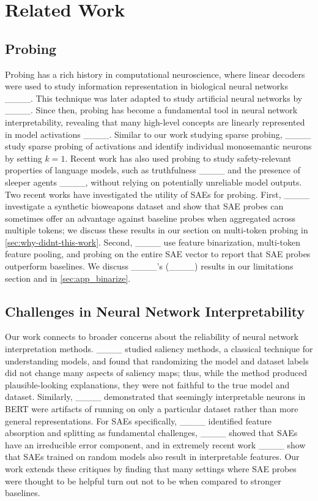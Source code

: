 \section{Related Work}
\label{sec:app-related-work}

\subsection{Probing}
Probing has a rich history in computational neuroscience, where linear decoders were used to study information representation in biological neural networks ____. This technique was later adapted to study artificial neural networks by ____. Since then, probing has become a fundamental tool in neural network interpretability, revealing that many high-level concepts are linearly represented in model activations ____. Similar to our work studying sparse probing, ____ study sparse probing of activations and identify individual monosemantic neurons by setting $k = 1$. Recent work has also used probing to study safety-relevant properties of language models, such as truthfulness ____ and the presence of sleeper agents ____, without relying on potentially unreliable model outputs. Two recent works have investigated the utility of SAEs for probing. First, ____ investigate a synthetic bioweapons dataset and show that SAE probes can sometimes offer an advantage against baseline probes when aggregated across multiple tokens; we discuss these results in our section on multi-token probing in \cref{sec:why-didnt-this-work}. Second, ____ use feature binarization, multi-token feature pooling, and probing on the entire SAE vector to report that SAE probes outperform baselines. We discuss ____'s (____) results in our limitations section and in \cref{sec:app_binarize}.

\subsection{Challenges in Neural Network Interpretability}
Our work connects to broader concerns about the reliability of neural network interpretation methods. ____ studied saliency methods, a classical technique for understanding models, and found that randomizing the model and dataset labels did not change many aspects of saliency maps; thus, while the method produced plausible-looking explanations, they were not faithful to the true model and dataset. Similarly, ____ demonstrated that seemingly interpretable neurons in BERT were artifacts of running on only a particular dataset rather than more general representations. For SAEs specifically, ____ identified feature absorption and splitting as fundamental challenges, ____ showed that SAEs have an irreducible error component, and in extremely recent work ____ show that SAEs trained on random models also result in interpretable features. Our work extends these critiques by finding that many settings where SAE probes were thought to be helpful turn out not to be when compared to stronger baselines.

